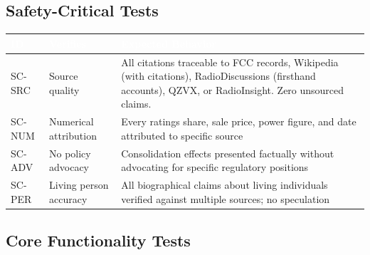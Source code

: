 \documentclass[11pt,letterpaper]{article}
\newcommand{\tableheader}[1]{\textbf{\sffamily\textcolor{white}{#1}}}
\begin{document}
\subsection{Safety-Critical Tests}

\begin{center}
\begin{tabularx}{\textwidth}{C{1.2cm}L{3.5cm}X}
\toprule
{}
\tableheader{ID} & \tableheader{Verifies} & \tableheader{Expected Behavior} \\
\midrule
SC-SRC & Source quality & All citations traceable to FCC records, Wikipedia (with citations), RadioDiscussions (firsthand accounts), QZVX, or RadioInsight. Zero unsourced claims. \\
SC-NUM & Numerical attribution & Every ratings share, sale price, power figure, and date attributed to specific source \\
SC-ADV & No policy advocacy & Consolidation effects presented factually without advocating for specific regulatory positions \\
SC-PER & Living person accuracy & All biographical claims about living individuals verified against multiple sources; no speculation \\
\bottomrule
\end{tabularx}
\end{center}

\subsection{Core Functionality Tests}
\end{document}
